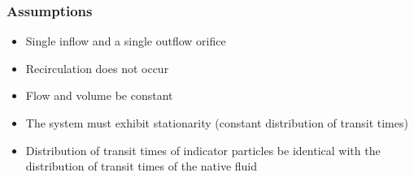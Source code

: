 %
%

\begin{frame}
  \frametitle{Assumptions}
    \cite{zierlerTheoreticalBasisIndicatorDilution1962}
    \begin{itemize}
        \item Single inflow and a single outflow orifice
        \item Recirculation does not occur
        \item Flow and volume be constant
        \item The system must exhibit stationarity (constant distribution of transit times)
        \item Distribution of transit times of indicator particles be identical with the distribution of transit times of the native fluid

    \end{itemize}

\end{frame}


